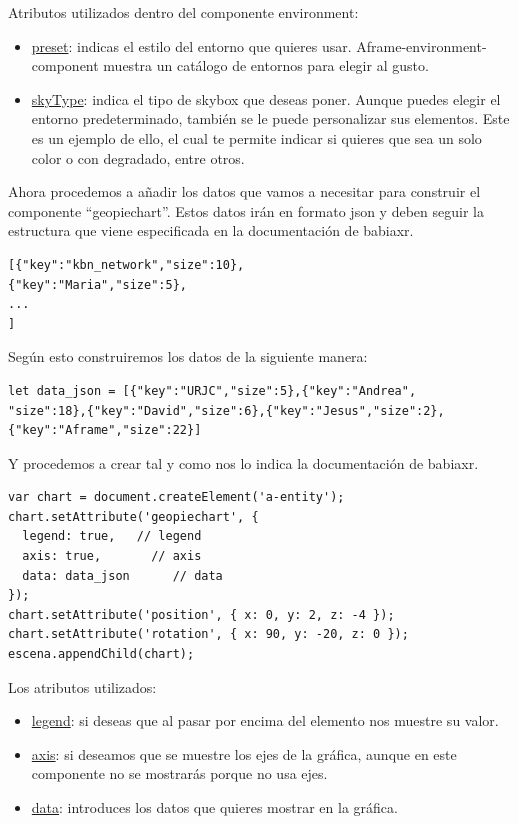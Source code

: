 \documentclass[a4paper, 12pt]{book}
\begin{document}
Atributos utilizados dentro del componente environment:

\begin{itemize}
    \item \underline{preset}: indicas el estilo del entorno que quieres usar. Aframe-environment-component muestra un catálogo de entornos para elegir al gusto.
    \item \underline{skyType}: indica el tipo de skybox que deseas poner. Aunque puedes elegir el entorno predeterminado, también se le puede personalizar sus elementos. Este es un ejemplo de ello, el cual te permite indicar si quieres que sea un solo color o con degradado, entre otros.
\end{itemize}

Ahora procedemos a añadir los datos que vamos a necesitar para construir el componente “geopiechart”. Estos datos irán en formato json y deben seguir la estructura que viene especificada en la documentación de babiaxr.

\begin{lstlisting}[frame=single]
[{"key":"kbn_network","size":10},
{"key":"Maria","size":5},
...
]
\end{lstlisting}

Según esto construiremos los datos de la siguiente manera:

\begin{lstlisting}[frame=single]
let data_json = [{"key":"URJC","size":5},{"key":"Andrea",
"size":18},{"key":"David","size":6},{"key":"Jesus","size":2},
{"key":"Aframe","size":22}]
\end{lstlisting}

Y procedemos a crear tal y como nos lo indica la documentación de babiaxr.

\begin{lstlisting}[frame=single]
var chart = document.createElement('a-entity');
chart.setAttribute('geopiechart', {
  legend: true,   // legend
  axis: true,       // axis
  data: data_json      // data
});
chart.setAttribute('position', { x: 0, y: 2, z: -4 });
chart.setAttribute('rotation', { x: 90, y: -20, z: 0 });
escena.appendChild(chart);
\end{lstlisting}


Los atributos utilizados:
\begin{itemize}
    \item \underline{legend}: si deseas que al pasar por encima del elemento nos muestre su valor.
    \item \underline{axis}: si deseamos que se muestre los ejes de la gráfica, aunque en este componente no se mostrarás porque no usa ejes.
    \item \underline{data}: introduces los datos que quieres mostrar en la gráfica.
\end{itemize}
\end{document}
